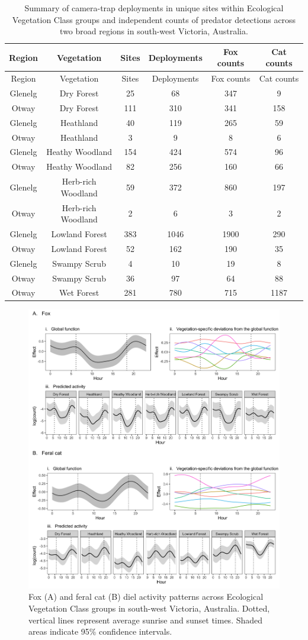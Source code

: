 \documentclass[]{elsarticle} %
\begin{document}
\newpage

\begin{longtable}[]{@{}cccccc@{}}
\caption{Summary of camera-trap deployments in unique sites within Ecological Vegetation Class groups and independent counts of predator detections across two broad regions in south-west Victoria, Australia.}\tabularnewline
\toprule
Region & Vegetation & Sites & Deployments & Fox counts & Cat counts\tabularnewline
\midrule
\endfirsthead
\toprule
Region & Vegetation & Sites & Deployments & Fox counts & Cat counts\tabularnewline
\midrule
\endhead
Glenelg & Dry Forest & 25 & 68 & 347 & 9\tabularnewline
Otway & Dry Forest & 111 & 310 & 341 & 158\tabularnewline
Glenelg & Heathland & 40 & 119 & 265 & 59\tabularnewline
Otway & Heathland & 3 & 9 & 8 & 6\tabularnewline
Glenelg & Heathy Woodland & 154 & 424 & 574 & 96\tabularnewline
Otway & Heathy Woodland & 82 & 256 & 160 & 66\tabularnewline
Glenelg & Herb-rich Woodland & 59 & 372 & 860 & 197\tabularnewline
Otway & Herb-rich Woodland & 2 & 6 & 3 & 2\tabularnewline
Glenelg & Lowland Forest & 383 & 1046 & 1900 & 290\tabularnewline
Otway & Lowland Forest & 52 & 162 & 190 & 35\tabularnewline
Glenelg & Swampy Scrub & 4 & 10 & 19 & 8\tabularnewline
Otway & Swampy Scrub & 36 & 97 & 64 & 88\tabularnewline
Otway & Wet Forest & 281 & 780 & 715 & 1187\tabularnewline
\bottomrule
\end{longtable}

\newpage

\begin{figure}
\includegraphics[width=1\linewidth]{../figs/predator_veg} \caption{Fox (A) and feral cat (B) diel activity patterns across Ecological Vegetation Class groups in south-west Victoria, Australia. Dotted, vertical lines represent average sunrise and sunset times. Shaded areas indicate 95\% confidence intervals.}\label{fig:veg}
\end{figure}
\end{document}
